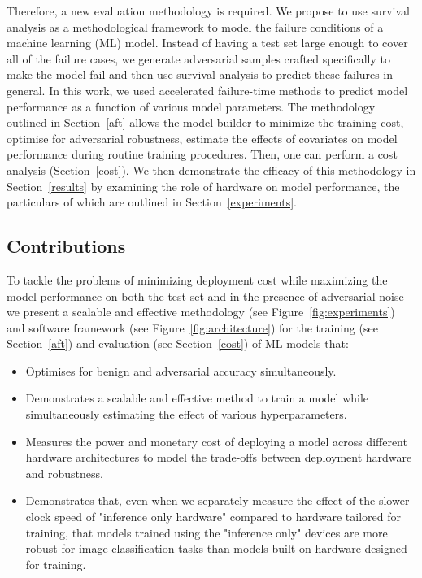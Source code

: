 \documentclass[sn-mathphys-num]{sn-jnl}%
\begin{document}
Therefore, a new evaluation methodology is required.
We propose to use survival analysis as a methodological framework to model the failure conditions of a machine learning (ML) model. Instead of having a test set large enough to cover all of the failure cases, we generate adversarial samples crafted specifically to make the model fail and then use survival analysis to predict these failures in general.
In this work, we used accelerated failure-time methods to predict model performance as a function of various model parameters. The methodology outlined in Section~\ref{aft} allows the model-builder to minimize the training cost, optimise for adversarial robustness, estimate the effects of covariates on model performance during routine training procedures. Then, one can perform a cost analysis (Section~\ref{cost}). We then demonstrate the efficacy of this methodology in Section~\ref{results} by examining the role of hardware on model performance, the particulars of which are outlined in Section~\ref{experiments}.


\subsection{Contributions}
To tackle the problems of minimizing deployment cost while maximizing the model performance on both the test set and in the presence of adversarial noise we present a scalable and effective methodology (see  Figure~\ref{fig:experiments}) and software framework (see Figure~\ref{fig:architecture}) for the training (see Section~\ref{aft}) and evaluation (see Section~\ref{cost}) of ML models that:
\begin{itemize}
    \item Optimises for benign and adversarial accuracy simultaneously.
    \item Demonstrates a scalable and effective method to train a model while simultaneously estimating the effect of various hyperparameters.
    \item Measures the power and monetary cost of deploying a model across different hardware architectures to model the trade-offs between deployment hardware and robustness.
    \item Demonstrates that, even when we separately measure the effect of the slower clock speed of "inference only hardware" compared to hardware tailored for training, that models trained using the "inference only" devices are more robust for image classification tasks than models built on hardware designed for training.
\end{itemize}
\end{document}
